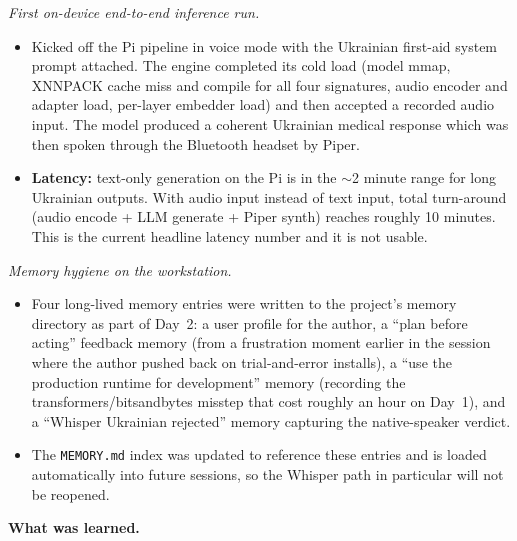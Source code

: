 \documentclass{article}
\theoremstyle{plain}
\theoremstyle{definition}
\theoremstyle{remark}
\begin{document}
\textit{First on-device end-to-end inference run.}
\begin{itemize}
\item Kicked off the Pi pipeline in voice mode with the Ukrainian first-aid system prompt attached. The engine completed its cold load (model mmap, XNNPACK cache miss and compile for all four signatures, audio encoder and adapter load, per-layer embedder load) and then accepted a recorded audio input. The model produced a coherent Ukrainian medical response which was then spoken through the Bluetooth headset by Piper.
\item \textbf{Latency:} text-only generation on the Pi is in the $\sim$2 minute range for long Ukrainian outputs. With audio input instead of text input, total turn-around (audio encode + LLM generate + Piper synth) reaches roughly 10 minutes. This is the current headline latency number and it is not usable.
\end{itemize}

\textit{Memory hygiene on the workstation.}
\begin{itemize}
\item Four long-lived memory entries were written to the project's memory directory as part of Day~2: a user profile for the author, a ``plan before acting'' feedback memory (from a frustration moment earlier in the session where the author pushed back on trial-and-error installs), a ``use the production runtime for development'' memory (recording the transformers/bitsandbytes misstep that cost roughly an hour on Day~1), and a ``Whisper Ukrainian rejected'' memory capturing the native-speaker verdict.
\item The \texttt{MEMORY.md} index was updated to reference these entries and is loaded automatically into future sessions, so the Whisper path in particular will not be reopened.
\end{itemize}

\textbf{What was learned.}
\end{document}
